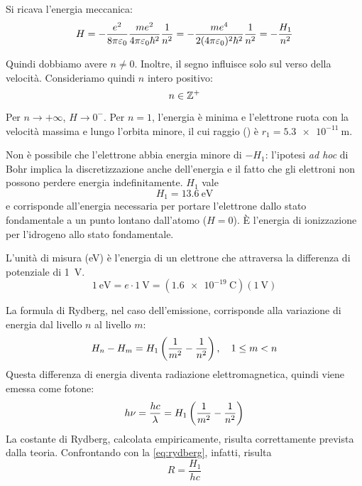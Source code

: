 Si ricava l'energia meccanica:
\begin{equation}
\label{eq:energia_bohr}
    H = - \frac{e^2}{8 \pi \varepsilon_0} \frac{m e^2}{4\pi \varepsilon_0 \hbar^2} \frac{1}{n^2} = - \frac{m e^4}{2 (4\pi \varepsilon_0)^2 \hbar^2} \frac{1}{n^2} = -\frac{H_1}{n^2}
\end{equation}

Quindi dobbiamo avere $n \ne 0$.
Inoltre, il segno influisce solo sul verso della velocità.
Consideriamo quindi $n$ intero positivo:
\begin{equation}
    n \in \mathbb{Z}^+
\end{equation}

Per $n \to +\infty$, $H \to 0^-$.
Per $n = 1$, l'energia è minima e l'elettrone ruota con la velocità massima e lungo l'orbita minore, il cui raggio () è $r_1 = \qty{5.3e-11}{\metre}$.

Non è possibile che l'elettrone abbia energia minore di $-H_1$: l'ipotesi \textit{ad hoc} di Bohr implica la discretizzazione anche dell'energia e il fatto che gli elettroni non possono perdere energia indefinitamente.
$H_1$ vale
\begin{equation}
    H_1 = \qty{13.6}{\electronvolt}
\end{equation}
e corrisponde all'energia necessaria per portare l'elettrone dallo stato fondamentale a un punto lontano dall'atomo ($H = 0$).
È l'energia di ionizzazione per l'idrogeno allo stato fondamentale.

L'unità di misura  (\unit{\electronvolt}) è l'energia di un elettrone che attraversa la differenza di potenziale di \qty{1}{\volt}.
\begin{equation}
    \qty{1}{\electronvolt}
    = e \cdot \qty{1}{\volt}
    = (\qty{1.6e-19}{\coulomb}) (\qty{1}{\volt})
\end{equation}

La formula di Rydberg, nel caso dell'emissione, corrisponde alla variazione di energia dal livello $n$ al livello $m$:
\begin{equation}
    H_n - H_m = H_1 \left( \frac{1}{m^2} - \frac{1}{n^2} \right), \quad 1 \le m < n
\end{equation}
Questa differenza di energia diventa radiazione elettromagnetica, quindi viene emessa come fotone:
\begin{equation}
    h \nu = \frac{h c}{\lambda} = H_1 \left( \frac{1}{m^2} - \frac{1}{n^2} \right)
\end{equation}
La costante di Rydberg, calcolata empiricamente, risulta correttamente prevista dalla teoria.
Confrontando con la \eqref{eq:rydberg}, infatti, risulta
\begin{equation}
    R = \frac{H_1}{h c}
\end{equation}


